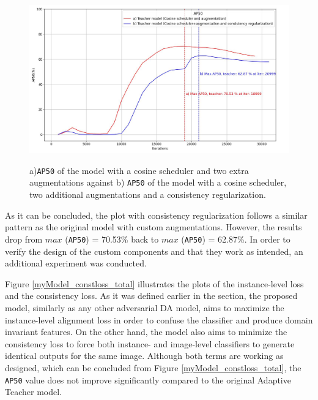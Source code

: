\begin{figure}[htb]
	\begin{center}
		\includegraphics[width=14cm]{./AP50_Augm_consistency.jpg}
	\end{center}
	\caption{a)\texttt{AP50} of the model with a cosine  scheduler and two extra augmentations against b) \texttt{AP50} of the model with a cosine scheduler, two additional augmentations and a consistency regularization.}
	\begin{center}
		\label{myModel_experiment}
	\end{center}
\end{figure}

As it can be concluded, the plot with consistency regularization follows a similar pattern as the original model with custom augmentations. However, the results drop from $max$ (\texttt{AP50}) = 70.53\% back to  $max$ (\texttt{AP50}) = 62.87\%. In order to verify the design of the custom components and that they work as intended, an additional experiment was conducted. 

Figure \ref{myModel_constloss_total} illustrates the plots of the instance-level loss and the  consistency loss. As it was defined earlier in the  section, the proposed model, similarly as any other adversarial DA model, aims to maximize the instance-level alignment loss in order to confuse the classifier and produce domain invariant features. On the other hand, the model also aims to minimize the consistency loss to force both instance- and image-level classifiers to generate identical outputs for the same image. Although both terms are working as designed, which can be concluded from Figure \ref{myModel_constloss_total}, the \texttt{AP50} value does not improve significantly compared to the original Adaptive Teacher model. 

